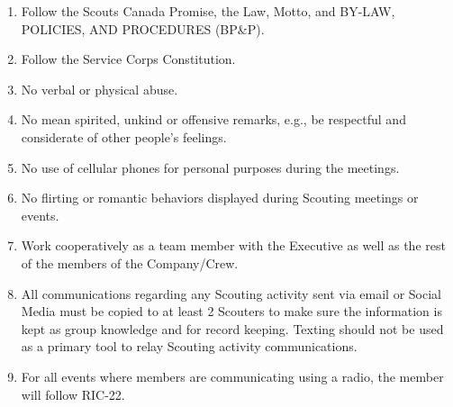 \documentclass{Service_Corps_Document}
\begin{document}
    \def \Title {Code of Conduct}
    \def \Company {Service Corps}
    \def \versionNumber {3.1}
    \stdFooter
    \begin{titlepage}
        \stdTitlePage
    \end{titlepage}
    \begin{enumerate}
        \item Follow the Scouts Canada Promise, the Law, Motto, and BY-LAW, POLICIES, AND PROCEDURES (BP\&P).
        \item Follow the Service Corps Constitution.
        \item No verbal or physical abuse.
        \item No mean spirited, unkind or offensive remarks, e.g., be respectful and considerate of other people's feelings.
        \item No use of cellular phones for personal purposes during the meetings.
        \item No flirting or romantic behaviors displayed during Scouting meetings or events.
        \item Work cooperatively as a team member with the Executive as well as the rest of the members of the Company/Crew.
        \item All communications regarding any Scouting activity sent via email or Social Media must be copied to at least 2 Scouters to make sure the information is kept as group knowledge and for record keeping.
        Texting should not be used as a primary tool to relay Scouting activity communications.
        \item For all events where members are communicating using a radio, the member will follow RIC-22.
    \end{enumerate}
\end{document}
